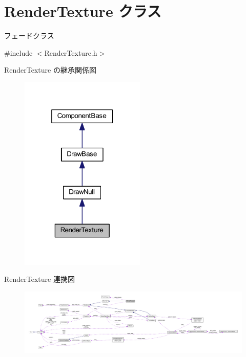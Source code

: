 \hypertarget{class_render_texture}{}\section{Render\+Texture クラス}
\label{class_render_texture}


フェードクラス  




{\ttfamily \#include $<$Render\+Texture.\+h$>$}



Render\+Texture の継承関係図\nopagebreak
\begin{figure}[H]
\begin{center}
\leavevmode
\includegraphics[width=169pt]{class_render_texture__inherit__graph}
\end{center}
\end{figure}


Render\+Texture 連携図\nopagebreak
\begin{figure}[H]
\begin{center}
\leavevmode
\includegraphics[width=350pt]{class_render_texture__coll__graph}
\end{center}
\end{figure}
